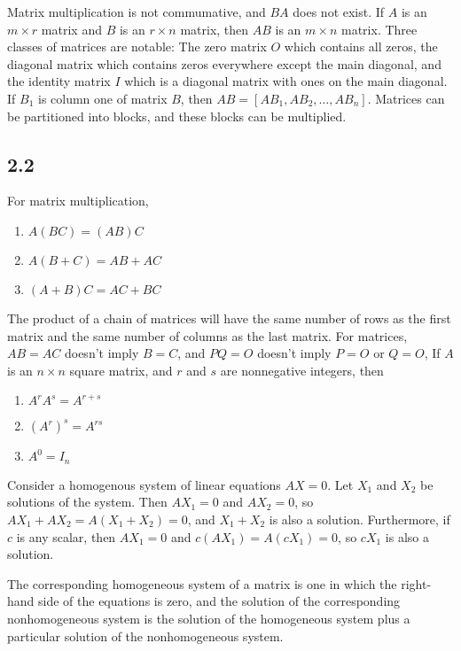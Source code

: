 \documentclass{article}
\begin{document}
    Matrix multiplication is not commumative, and $BA$ does not exist.
    If $A$ is an $m \times r$ matrix and $B$ is an $r \times n$ matrix, 
    then $AB$ is an $m \times n$ matrix.
    Three classes of matrices are notable: 
    The zero matrix $O$ which contains all zeros, 
    the diagonal matrix which contains zeros everywhere except the main diagonal,
    and the identity matrix $I$ which is a diagonal matrix with ones on the main diagonal.
    If $B_1$ is column one of matrix $B$,
    then $AB = [AB_1, AB_2, \dots, AB_n]$.
    Matrices can be partitioned into blocks, and these blocks can be multiplied.

    \subsection*{2.2}
    For matrix multiplication,
    \begin{enumerate}
        \item $A(BC) = (AB)C$
        \item $A(B + C) = AB + AC$
        \item $(A + B)C = AC + BC$
    \end{enumerate}
    The product of a chain of matrices will have the same number of rows as the first matrix 
    and the same number of columns as the last matrix. 
    For matrices, $AB = AC$ doesn't imply $B = C$, and
    $PQ = O$ doesn't imply $P = O$ or $Q = O$, 
    If $A$ is an $n \times n$ square matrix, and $r$ and $s$ are nonnegative integers, then
    \begin{enumerate}
        \item $A^rA^s = A^{r+s}$
        \item $(A^r)^s = A^{rs}$
        \item $A^0 = I_n$
    \end{enumerate}

    Consider a homogenous system of linear equations $AX = 0$. 
    Let $X_1$ and $X_2$ be solutions of the system.
    Then $AX_1 = 0$ and $AX_2 = 0$, so $AX_1 + AX_2 = A(X_1 + X_2) = 0$, and $X_1 + X_2$ is also a solution.
    Furthermore, if $c$ is any scalar, then $AX_1 = 0$ and $c(AX_1) = A(cX_1) = 0$, so $cX_1$ is also a solution.

    The corresponding homogeneous system of a matrix is one in which the right-hand side of the equations is zero,
    and the solution of the corresponding nonhomogeneous system is the solution of the homogeneous system plus a particular solution of the nonhomogeneous system.
\end{document}
